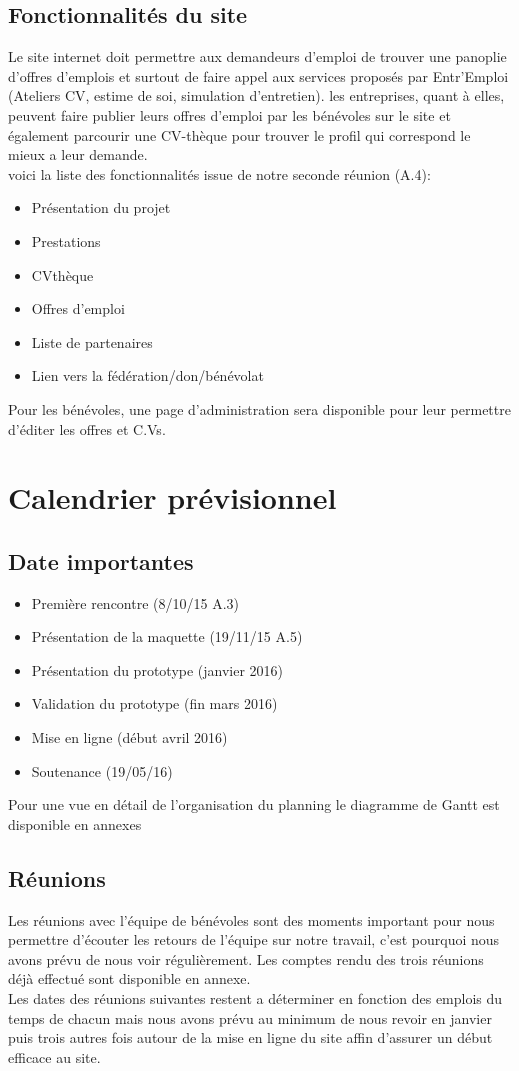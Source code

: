 \documentclass[a4paper, 12pt]{report}
\begin{document}
\section{Fonctionnalités du site}
Le site internet doit permettre aux demandeurs d'emploi de trouver une panoplie d'offres d'emplois et surtout de faire
appel aux services proposés par Entr'Emploi (Ateliers CV, estime de soi, simulation d'entretien).
les entreprises, quant à elles, peuvent faire publier leurs offres d'emploi par les bénévoles sur le site et également
parcourir une CV-thèque pour trouver le profil qui correspond le mieux a leur demande.\\
voici la liste des fonctionnalités issue de notre seconde réunion (A.4):
\begin{itemize}
    \item Présentation du projet
    \item Prestations
    \item CVthèque
    \item Offres d'emploi
    \item Liste de partenaires
    \item Lien vers la fédération/don/bénévolat
\end{itemize}
Pour les bénévoles, une page d'administration sera disponible pour leur permettre d'éditer les offres et C.Vs.

\chapter{Calendrier prévisionnel}
\thispagestyle{fancy}
\section{Date importantes}
\begin{itemize}
\item Première rencontre (8/10/15 A.3)
\item Présentation de la maquette (19/11/15 A.5)
\item Présentation du prototype (janvier 2016)
\item Validation du prototype (fin mars 2016)
\item Mise en ligne (début avril 2016)
\item Soutenance (19/05/16)
\end{itemize}
Pour une vue en détail de l'organisation du planning le diagramme de Gantt est disponible en annexes
\section{Réunions}
Les réunions avec l'équipe de bénévoles sont des moments important pour nous permettre d'écouter les retours de l'équipe sur notre travail, c'est pourquoi nous avons prévu de nous voir régulièrement. Les comptes rendu des trois réunions déjà effectué sont disponible en annexe.\\ Les dates des réunions suivantes restent a déterminer en fonction des emplois du temps de chacun mais nous avons prévu au minimum de nous revoir en janvier puis trois autres fois autour de la mise en ligne du site affin d'assurer un début efficace au site.
\end{document}
